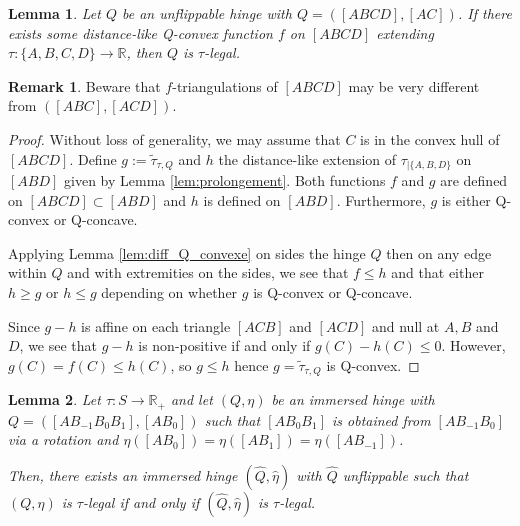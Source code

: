 \documentclass[a4paper,12pt]{article}
\def\RR{\mathbb{R}}
\newcommand{\tautilde}[2]{\widetilde\tau_{#1,#2}}
\newtheorem{lem}{Lemma}[section]		 %
\theoremstyle{definition}
\newtheorem*{rem}{Remark}			 %
\begin{document}
						\begin{lem} \label{lem:arrete_ext}
							Let $Q$ be an unflippable hinge with $Q=([ABCD],[AC])$.
							If there exists some distance-like Q-convex function $f$ on $[ABCD]$ extending $\tau: \{A,B,C,D\} \rightarrow \RR$, then $Q$ is $\tau$-legal.
						\end{lem}
						\begin{rem} Beware that $f$-triangulations of $[ABCD]$ may be very different from $([ABC],[ACD])$. 
						 
						\end{rem}

						
						\begin{proof}
							Without loss of generality, we may assume that $C$ is in the convex hull of 
							$[ABCD]$.
							Define $g:=\tautilde{\tau}{Q}$ and $h$ the 
							distance-like extension of $\tau_{|\{A,B,D\}}$ on $[ABD]$ given by Lemma \ref{lem:prolongement}.
							Both functions $f$ and $g$ are defined on $[ABCD]\subset [ABD]$ and $h$ is defined on $[ABD]$. Furthermore, $g$ is either Q-convex or Q-concave.
							
							Applying Lemma \ref{lem:diff_Q_convexe} on sides the hinge $Q$ then on any edge within $Q$ and with extremities on the sides, we see that $f\leq h$ and that either $h\geq g$ or $h\leq g$ depending on whether $g$ is  Q-convex or Q-concave.

							Since $g-h$ is affine on each triangle $[ACB]$ and $[ACD]$ and null at $A,B$ and $D$, we see that
							$g-h$ is non-positive	if and only if $g(C)-h(C)\leq 0$.
							However, $g(C)=f(C)\leq h(C)$, so $g\leq h$ hence $g=\tautilde{\tau}{Q}$ is Q-convex.
						\end{proof}
						\begin{lem} \label{lem:arrete_deg} Let $\tau:S\rightarrow \RR_+$ and 
						 let $(Q,\eta)$ be an immersed hinge with $Q=([AB_{-1}B_0B_{1}],[AB_0])$ such that $[AB_0B_{1}]$ is obtained from $[AB_{-1}B_0]$ via a rotation and $\eta([AB_0])=\eta([AB_1])=\eta([AB_{-1}])$.
						 
						Then, there exists an immersed hinge $(\hat Q,\hat\eta)$ with $\hat Q$ unflippable such that 
						$(Q,\eta)$ is $\tau$-legal if and only if $(\hat Q,\hat\eta)$ is $\tau$-legal.				
						\end{lem}
\end{document}
